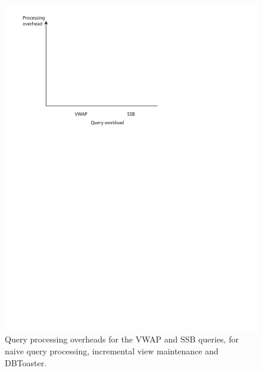 \documentclass{sig-alternate}
\begin{document}
\begin{figure}
\includegraphics[scale=0.6]{figures/axes-query.pdf}
\caption{Query processing overheads for the VWAP and SSB queries, for naive
  query processing, incremental view maintenance and DBToaster.}
\label{fig:overhead-vwap-ssb}
\end{figure}
\end{document}

